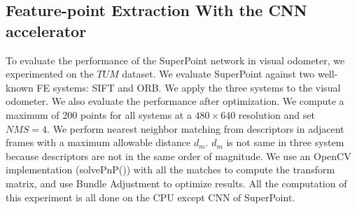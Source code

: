 



\subsection{ Feature-point Extraction With the CNN accelerator }

To evaluate the performance of the SuperPoint network in visual odometer, we experimented on the $TUM$ dataset. We evaluate SuperPoint against two well-known FE systems: SIFT\cite{Lowe-478} and ORB\cite{RubleeRabaud-479}. We apply the three systems to the visual odometer. We also evaluate the performance after optimization. We compute a maximum of 200 points for all systems at a $480\times640$ resolution and set $NMS=4$. We perform nearest neighbor matching from descriptors in adjacent frames with a maximum allowable distance $d_m$. $d_m$ is not same in three system because descriptors are not in the same order of magnitude. We use an OpenCV implementation (solvePnP()) with all the matches to compute the transform matrix, and use Bundle Adjustment to optimize results. All the computation of this experiment is all done on the CPU except CNN of SuperPoint. 

